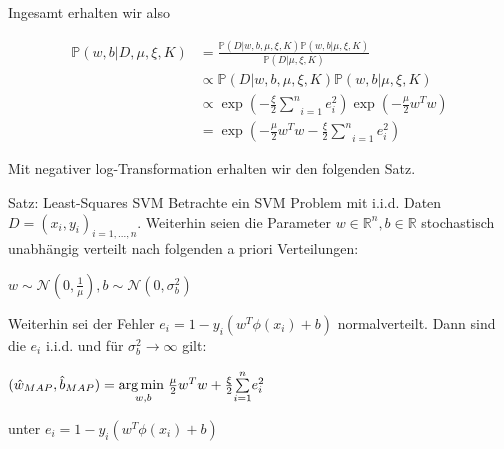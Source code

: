 \documentclass{beamer}
\begin{document}
{\begin{frame}
\end{frame}


\begin{frame}
Ingesamt erhalten wir also


\begin{align}
	\mathbb{P}(w,b\vert D,\mu,\xi,K) &= \frac{\mathbb{P}(D\vert w,b, \mu,\xi,K)					\mathbb{P}(w,b\vert \mu,\xi , K)}{\mathbb{P}(D\vert \mu,\xi,K)}  \\
	& \propto \mathbb{P}(D\vert w,b, \mu,\xi,K)\mathbb{P}(w,b\vert \mu,\xi , K) \\
	&\propto \exp(-\frac{\xi}{2}\underset{i=1}{\overset{n}{\sum}}e_i^2)\exp(-\frac{\mu}{2}		w^Tw) \\
	& = \exp(-\frac{\mu}{2}w^Tw - \frac{\xi}{2}\underset{i=1}{\overset{n}{\sum}}e_i^2)
\end{align}

Mit negativer log-Transformation erhalten wir den folgenden Satz.

\end{frame}


\begin{frame}
\begin{block}{Satz: Least-Squares SVM}
Betrachte ein SVM Problem mit i.i.d. Daten $D = (x_i,y_i)_{i=1,...,n}$. Weiterhin seien die Parameter $w\in \mathbb{R}^n, b\in \mathbb{R}$ stochastisch unabhängig verteilt nach folgenden a priori Verteilungen:

\begin{center}
$w \sim \mathcal{N}(0,\frac{1}{\mu}), b \sim \mathcal{N}(0, \sigma_b^2)$
\end{center}
 
Weiterhin sei der Fehler $e_i =  1 - y_i(w^T \phi(x_i) +b)$ normalverteilt. Dann
sind die $e_i$ i.i.d. und für $\sigma_b^2 \rightarrow \infty$ gilt:

\begin{center}
$(\hat{w}_{MAP},\hat{b}_{MAP})  = \underset{w,b}{\arg \min \hspace{0.1cm}} \frac{\mu}{2}w^Tw + \frac{\xi}{2}\underset{i=1}{\overset{n}{\sum}}e_i^2$

unter $e_i = 1 - y_i(w^T \phi(x_i) +b)$
\end{center}

\end{block}

\end{frame}

}
\end{document}
